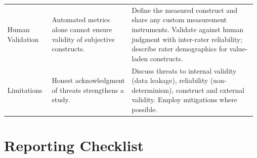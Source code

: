 \documentclass[smallextended]{svjour3}
\makeatletter
\newcommand{\must}{\textbf{must}\xspace}
\newcommand{\should}{\textbf{should}\xspace}
\newcommand{\paper}{\emph{paper}\xspace}
\newcommand{\supplementarymaterial}{\emph{supplementary material}\xspace}
\newcommand{\paper}{\emph{paper}\xspace}
\newcommand{\supplementarymaterial}{\emph{supplementary material}\xspace}
\newcommand{\iconM}{\usebox{\iconMbox}\xspace}
\newcommand{\iconS}{\usebox{\iconSbox}\xspace}
\newcommand{\iconM}{●\xspace}
\newcommand{\iconS}{○\xspace}
\newcommand{\condition}[1]{\texttt{\small[#1]}\,}
\newcommand{\condition}[1]{@@cond:#1@@}
\makeatother
\begin{document}
\begin{appendices}
\begin{center}
\begin{tabularx}{\textwidth}{@{}l>{\raggedright\arraybackslash}X>{\raggedright\arraybackslash}X@{}}
Human Validation & Automated metrics alone cannot ensure validity of subjective constructs. &
\iconM Define the measured construct and share any custom measurement instruments.
\newline \iconS Validate against human judgment with inter-rater reliability; describe rater demographics for value-laden constructs. \\
\addlinespace
Limitations & Honest acknowledgment of threats strengthens a study. &
\iconM Discuss threats to internal validity (data leakage), reliability (non-determinism), construct and external validity.
\newline \iconS Employ mitigations where possible. \\
\bottomrule
\end{tabularx}
\end{center}
 
\section{Reporting Checklist}
\label{sec:checklist}



\end{appendices}
\end{document}
